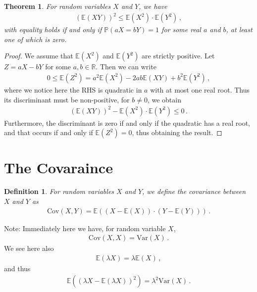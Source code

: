 \documentclass[11pt, onesided]{book}
\theoremstyle{break}
\theoremstyle{break}
\newtheorem{thm}{Theorem}[section]
\newtheorem{defn}{Definition}[thm]
\newcommand{\R}{\mathbb{R}}
\newcommand{\note}{\color{red}Note: \color{black}}
\begin{document}
\begin{thm}
For random variables $X$ and $Y$, we have
\begin{align*}
\left( \mathbb{E}(XY)\right)^2 \leq \mathbb{E}(X^2) \cdot \mathbb{E}(Y^2)\,,
\end{align*}
with equality holds if and only if $\mathbb{P}(aX = bY) = 1$ for some real $a$ and $b$, at least one of which is zero.
\end{thm}
\begin{proof}
We assume that $\mathbb{E}(X^2)$ and $\mathbb{E}(Y^2)$ are strictly positive. Let $Z = aX - bY$ for some $a,b \in \R$. Then we can write
\begin{align*}
0\leq \mathbb{E}(Z^2) = a^2 \mathbb{E}(X^2) - 2ab \mathbb{E}(XY) + b^2 \mathbb{E}(Y^2)\,,
\end{align*}
where we notice here the RHS is quadratic in $a$ with at most one real root. Thus its discriminant must be non-positive, for $b\neq 0$, we obtain
\begin{align*}
\left(\mathbb{E}(XY)\right)^2 - \mathbb{E}(X^2) \cdot \mathbb{E}(Y^2) \leq 0\,.
\end{align*}
Furthermore, the discriminant is zero if and only if the quadratic has a real root, and that occurs if and only if $\mathbb{E}(Z^2) = 0$, thus obtaining the result. 
\end{proof}

\section[The Covariance]{\color{red} The Covaraince\color{black}}
\begin{defn}
For random variables $X$ and $Y$, we define the covariance between $X$ and $Y$ as
\begin{align*}
\text{Cov}(X,Y) = \mathbb{E}\left((X-\mathbb{E}(X))\cdot  ( Y -\mathbb{E}(Y))\right)\,.
\end{align*}
\end{defn}
\note Immediately here we have, for random variable $X$, 
\begin{align*}
\text{Cov}(X,X) = \text{Var}(X)\,.
\end{align*}
We see here also 
\begin{align*}
\mathbb{E}(\lambda X) = \lambda \mathbb{E}(X)\,,
\end{align*}
and thus
\begin{align*}
\mathbb{E}\left((\lambda X - \mathbb{E}(\lambda X))^2 \right) = \lambda^2 \text{Var}(X)\,.
\end{align*}
\end{document}
